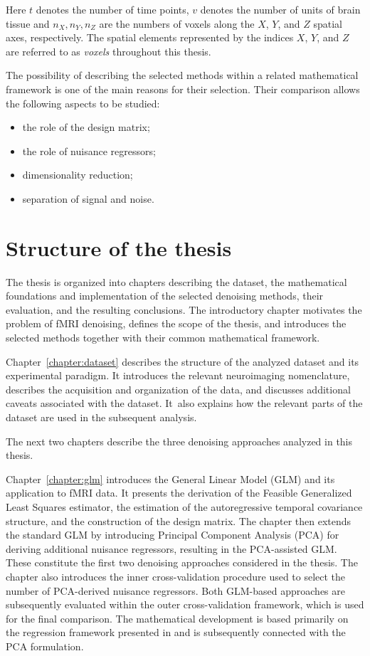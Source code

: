 \documentclass[english]{pwr_wmat_praca_dyplomowa}
\theoremstyle{definition}
\theoremstyle{remark}
\begin{document}
Here $t$ denotes the number of time points, $v$ denotes the number of units of brain tissue and $n_X, n_Y, n_Z$ are the numbers of voxels along the $X$, $Y$, and $Z$ spatial axes, respectively. The spatial elements represented by the indices $X$, $Y$, and $Z$ are referred to as \textit{voxels} throughout this thesis.

The possibility of describing the selected methods within a related mathematical framework is one of the main reasons for their selection. Their comparison allows the following aspects to be studied:
\begin{itemize}[itemsep=0pt, parsep=0pt, topsep=2pt]
    \item the role of the design matrix;
    \item the role of nuisance regressors;
    \item dimensionality reduction;
    \item separation of signal and noise.
\end{itemize}


\section{Structure of the thesis}

The thesis is organized into chapters describing the dataset, the mathematical foundations and implementation of the selected denoising methods, their evaluation, and the resulting conclusions. The introductory chapter motivates the problem of fMRI denoising, defines the scope of the thesis, and introduces the selected methods together with their common mathematical framework.

Chapter~\ref{chapter:dataset} describes the structure of the analyzed dataset and its experimental paradigm. It introduces the relevant neuroimaging nomenclature, describes the acquisition and organization of the data, and discusses additional caveats associated with the dataset. It~also explains how the relevant parts of the dataset are used in the subsequent analysis.

The next two chapters describe the three denoising approaches analyzed in this thesis.

Chapter~\ref{chapter:glm} introduces the General Linear Model (GLM) and its application to fMRI data. It presents the derivation of the Feasible Generalized Least Squares estimator, the estimation of the autoregressive temporal covariance structure, and the construction of the design matrix. The chapter then extends the standard GLM by introducing Principal Component Analysis (PCA) for deriving additional nuisance regressors, resulting in the PCA-assisted GLM. These constitute the first two denoising approaches considered in the thesis. The chapter also introduces the inner cross-validation procedure used to select the number of PCA-derived nuisance regressors. Both GLM-based approaches are subsequently evaluated within the outer cross-validation framework, which is used for the final comparison. The mathematical development is based primarily on the regression framework presented in \cite{agresti} and is subsequently connected with the PCA formulation.
\end{document}
